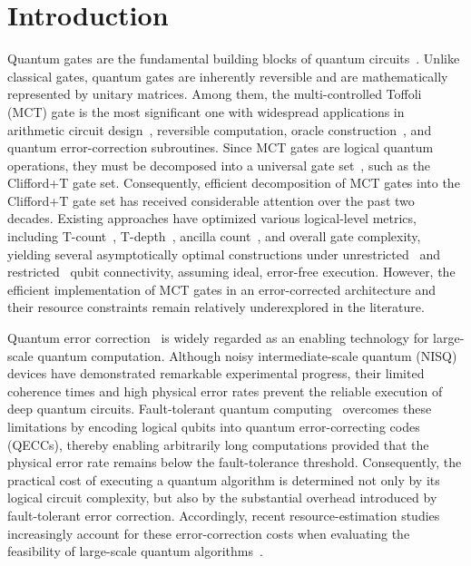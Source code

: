 \documentclass[sigconf]{acmart}
\begin{document}
\section{Introduction}
\label{sec:intro}
Quantum gates are the fundamental building blocks of quantum circuits~\cite{gates1995}. Unlike classical gates, quantum gates are inherently reversible and are mathematically represented by unitary matrices. Among them, the multi-controlled Toffoli (MCT) gate is the most significant one with widespread applications in arithmetic circuit design~\cite{arithmetic}, reversible computation, oracle construction~\cite{dutta2026qic}, and quantum error-correction subroutines. Since MCT gates are logical quantum operations, they must be decomposed into a universal gate set~\cite{universal-gate2005}, such as the Clifford+T gate set. Consequently, efficient decomposition of MCT gates into the Clifford+T gate set has received considerable attention over the past two decades. Existing approaches have optimized various logical-level metrics, including T-count~\cite{gidney2021cccz}, T-depth~\cite{dutta2025pra}, ancilla count~\cite{nie2024arxiv}, and overall gate complexity, yielding several asymptotically optimal constructions under unrestricted~\cite{khattar2025quantum,dutta2025pra} and restricted~\cite{bhaumik2026optimal} qubit connectivity, assuming ideal, error-free execution. However, the efficient implementation of MCT gates in an error-corrected architecture and their resource constraints remain relatively underexplored in the literature.

Quantum error correction~\cite{shor-code,qecc-25years} is widely regarded as an enabling technology for large-scale quantum computation. Although noisy intermediate-scale quantum (NISQ)~\cite{preskill2018quantum} devices have demonstrated remarkable experimental progress, their limited coherence times and high physical error rates prevent the reliable execution of deep quantum circuits. Fault-tolerant quantum computing~\cite{ftqc} overcomes these limitations by encoding logical qubits into quantum error-correcting codes (QECCs), thereby enabling arbitrarily long computations provided that the physical error rate remains below the fault-tolerance threshold. Consequently, the practical cost of executing a quantum algorithm is determined not only by its logical circuit complexity, but also by the substantial overhead introduced by fault-tolerant error correction. Accordingly, recent resource-estimation studies increasingly account for these error-correction costs when evaluating the feasibility of large-scale quantum algorithms~\cite{gidney2025factor,cain2026shor}.
\end{document}

